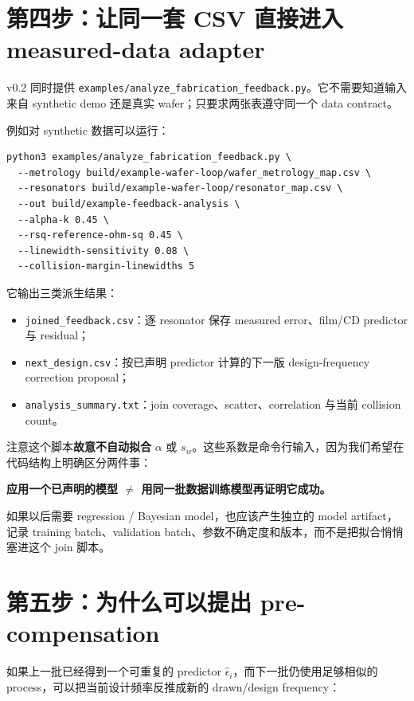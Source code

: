\section{第四步：让同一套 CSV 直接进入 measured-data adapter}

v0.2 同时提供 \texttt{examples/analyze\_fabrication\_feedback.py}。它不需要知道输入来自 synthetic demo 还是真实 wafer；只要求两张表遵守同一个 data contract。

例如对 synthetic 数据可以运行：

\begin{verbatim}
python3 examples/analyze_fabrication_feedback.py \
  --metrology build/example-wafer-loop/wafer_metrology_map.csv \
  --resonators build/example-wafer-loop/resonator_map.csv \
  --out build/example-feedback-analysis \
  --alpha-k 0.45 \
  --rsq-reference-ohm-sq 0.45 \
  --linewidth-sensitivity 0.08 \
  --collision-margin-linewidths 5
\end{verbatim}

它输出三类派生结果：

\begin{itemize}
  \item \texttt{joined\_feedback.csv}：逐 resonator 保存 measured error、film/CD predictor 与 residual；
  \item \texttt{next\_design.csv}：按已声明 predictor 计算的下一版 design-frequency correction proposal；
  \item \texttt{analysis\_summary.txt}：join coverage、scatter、correlation 与当前 collision count。
\end{itemize}

注意这个脚本\textbf{故意不自动拟合} $\alpha$ 或 $s_w$。这些系数是命令行输入，因为我们希望在代码结构上明确区分两件事：

\begin{center}
\textbf{应用一个已声明的模型 $\neq$ 用同一批数据训练模型再证明它成功。}
\end{center}

如果以后需要 regression / Bayesian model，也应该产生独立的 model artifact，记录 training batch、validation batch、参数不确定度和版本，而不是把拟合悄悄塞进这个 join 脚本。

\section{第五步：为什么可以提出 pre-compensation}

如果上一批已经得到一个可重复的 predictor $\hat{\epsilon}_i$，而下一批仍使用足够相似的 process，可以把当前设计频率反推成新的 drawn/design frequency：

